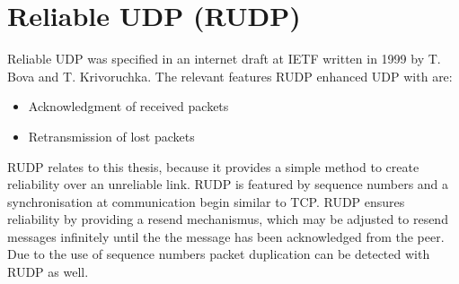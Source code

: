 \section{Reliable UDP (RUDP)}
Reliable UDP was specified in an internet draft at IETF written in 1999 by
T. Bova and T. Krivoruchka.\cite{rudp}
The relevant features RUDP enhanced UDP\cite{rfc768} with
are:
\begin{itemize}
\item Acknowledgment of received packets
\item Retransmission of lost packets
\end{itemize}
RUDP relates to this thesis, because it provides a simple method
to create reliability over an unreliable link. RUDP is
featured by sequence numbers and a synchronisation at communication
begin similar to TCP.\cite{rfc793}
RUDP ensures reliability by providing a resend mechanismus, which may
be adjusted to resend messages infinitely until the the message has
been acknowledged from the peer.
Due to the use of sequence numbers packet duplication can be detected
with RUDP as well.
